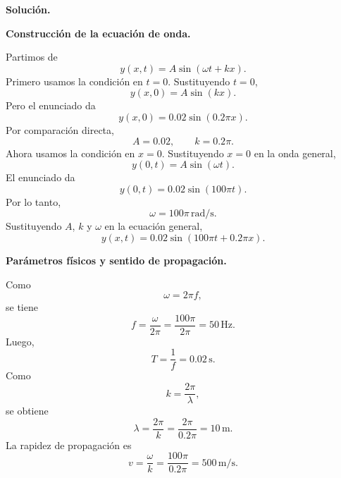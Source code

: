 \documentclass[11pt]{article}
\newcommand{\soluciontitulo}{%
  \par\medskip
  \noindent\textbf{Solución.}\par
  \smallskip
}
\newcommand{\paso}[1]{%
  \par\medskip
  \noindent\textbf{#1}\par
  \vspace{0.1em}%
}
\begin{document}
\soluciontitulo

\paso{Construcci\'on de la ecuaci\'on de onda.}
Partimos de
\begin{equation*}
    y(x,t)=A\sin(\omega t+kx).
\end{equation*}
Primero usamos la condici\'on en $t=0$. Sustituyendo $t=0$,
\begin{equation*}
    y(x,0)=A\sin(kx).
\end{equation*}
Pero el enunciado da
\begin{equation*}
    y(x,0)=0.02\sin(0.2\pi x).
\end{equation*}
Por comparaci\'on directa,
\begin{equation*}
    A=0.02,
    \qquad
    k=0.2\pi.
\end{equation*}
Ahora usamos la condici\'on en $x=0$. Sustituyendo $x=0$ en la onda general,
\begin{equation*}
    y(0,t)=A\sin(\omega t).
\end{equation*}
El enunciado da
\begin{equation*}
    y(0,t)=0.02\sin(100\pi t).
\end{equation*}
Por lo tanto,
\begin{equation*}
    \omega=100\pi\,\mathrm{rad/s}.
\end{equation*}
Sustituyendo $A$, $k$ y $\omega$ en la ecuaci\'on general,
\begin{equation*}
    \boxed{y(x,t)=0.02\sin(100\pi t+0.2\pi x)}.
\end{equation*}

\paso{Par\'ametros f\'isicos y sentido de propagaci\'on.}
Como
\begin{equation*}
    \omega=2\pi f,
\end{equation*}
se tiene
\begin{equation*}
    f=\frac{\omega}{2\pi}=\frac{100\pi}{2\pi}=50\,\mathrm{Hz}.
\end{equation*}
Luego,
\begin{equation*}
    T=\frac{1}{f}=0.02\,\mathrm{s}.
\end{equation*}
Como
\begin{equation*}
    k=\frac{2\pi}{\lambda},
\end{equation*}
se obtiene
\begin{equation*}
    \lambda=\frac{2\pi}{k}=\frac{2\pi}{0.2\pi}=10\,\mathrm{m}.
\end{equation*}
La rapidez de propagaci\'on es
\begin{equation*}
    v=\frac{\omega}{k}=\frac{100\pi}{0.2\pi}=500\,\mathrm{m/s}.
\end{equation*}
\end{document}
